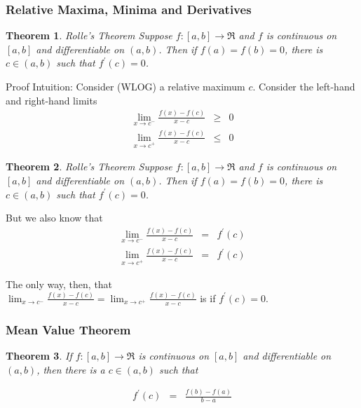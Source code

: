 \documentclass{beamer}
\newtheorem{thm}{Theorem}
\numberwithin{equation}{section}
\begin{document}
\begin{frame}
\frametitle{Relative Maxima, Minima and Derivatives}
\begin{thm} Rolle's Theorem Suppose $f:[a,b] \rightarrow \Re$ and $f$ is continuous on $[a,b]$ and differentiable on $(a,b)$.  Then if $f(a) = f(b) = 0$, there is $c \in (a, b)$ such that $f^{'}(c) = 0$.  \end{thm}

Proof
Intuition: Consider (WLOG) a relative maximum $c$. Consider the left-hand and right-hand limits
\begin{eqnarray}
\lim_{x \rightarrow c^{-}} \frac{f(x) - f(c) }{x - c } & \geq & 0 \nonumber \\
\lim_{x \rightarrow c^{+}} \frac{f(x) - f(c) } {x - c }  & \leq & 0 \nonumber 
\end{eqnarray}

\end{frame}


\begin{frame}
\begin{thm} Rolle's Theorem Suppose $f:[a,b] \rightarrow \Re$ and $f$ is continuous on $[a,b]$ and differentiable on $(a,b)$.  Then if $f(a) = f(b) = 0$, there is $c \in (a, b)$ such that $f^{'}(c) = 0$.  \end{thm}

But we also know that 
\begin{eqnarray}
\lim_{x \rightarrow c^{-}} \frac{f(x) - f(c ) }{x - c } & = & f^{'}(c) \nonumber \\
\lim_{x \rightarrow c^{+}} \frac{f(x) - f(c) } {x - c }  &  =  & f^{'}(c)  \nonumber 
\end{eqnarray}

The only way, then, that \\
$\lim_{x \rightarrow c^{-}} \frac{f(x) - f(c) }{x -c}  = \lim_{x \rightarrow c^{+}} \frac{f(x) - f(c) } {x - c} $ is if $f^{'}(c) = 0$.  

\end{frame}



\begin{frame}
\frametitle{Mean Value Theorem} 

\begin{thm} If $f:[a,b] \rightarrow \Re$ is continuous on $[a,b]$ and differentiable on $(a,b)$, then there is a $c \in (a,b)$ such that 

\begin{eqnarray}
f^{'}(c) & = & \frac{f(b) - f(a) } { b - a} \nonumber 
\end{eqnarray}
\end{thm}

\end{frame}
\end{document}
